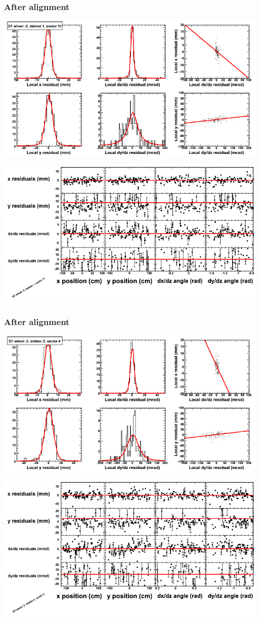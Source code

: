 \documentclass[compress]{beamer}
\begin{document}
\begin{frame}
\frametitle{After alignment}
\includegraphics[width=0.7\linewidth]{NOV4_fitfunctions/MBwhAst1sec11_bellcurves.png}

\includegraphics[width=0.7\linewidth]{NOV4_fitfunctions/MBwhAst1sec11_polynomials.png}
\end{frame}

\begin{frame}
\frametitle{After alignment}
\includegraphics[width=0.7\linewidth]{NOV4_fitfunctions/MBwhAst2sec04_bellcurves.png}

\includegraphics[width=0.7\linewidth]{NOV4_fitfunctions/MBwhAst2sec04_polynomials.png}
\end{frame}
\end{document}
